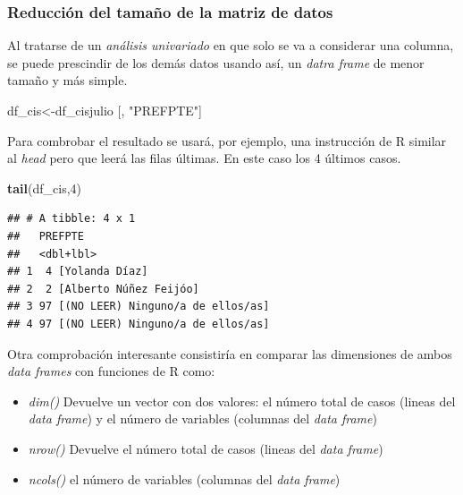 \documentclass[
]{article}
\newenvironment{Shaded}{\begin{snugshade}}{\end{snugshade}}
\newcommand{\DecValTok}[1]{\textcolor[rgb]{0.00,0.00,0.81}{#1}}
\newcommand{\FunctionTok}[1]{\textcolor[rgb]{0.13,0.29,0.53}{\textbf{#1}}}
\newcommand{\NormalTok}[1]{#1}
\newcommand{\OtherTok}[1]{\textcolor[rgb]{0.56,0.35,0.01}{#1}}
\newcommand{\StringTok}[1]{\textcolor[rgb]{0.31,0.60,0.02}{#1}}
\providecommand{\tightlist}{%
  \setlength{\itemsep}{0pt}\setlength{\parskip}{0pt}}
\begin{document}
\hypertarget{reducciuxf3n-del-tamauxf1o-de-la-matriz-de-datos}{%
\subsubsection{Reducción del tamaño de la matriz de
datos}\label{reducciuxf3n-del-tamauxf1o-de-la-matriz-de-datos}}

Al tratarse de un \emph{análisis univariado} en que solo se va a
considerar una columna, se puede prescindir de los demás datos usando
así, un \emph{datra frame} de menor tamaño y más simple.

\begin{Shaded}
\begin{Highlighting}[]
\NormalTok{df\_cis}\OtherTok{\textless{}{-}}\NormalTok{df\_cisjulio [, }\StringTok{"PREFPTE"}\NormalTok{]}
\end{Highlighting}
\end{Shaded}

Para combrobar el resultado se usará, por ejemplo, una instrucción de R
similar al \emph{head} pero que leerá las filas últimas. En este caso
los 4 últimos casos.

\begin{Shaded}
\begin{Highlighting}[]
\FunctionTok{tail}\NormalTok{(df\_cis,}\DecValTok{4}\NormalTok{)}
\end{Highlighting}
\end{Shaded}

\begin{verbatim}
## # A tibble: 4 x 1
##   PREFPTE                             
##   <dbl+lbl>                           
## 1  4 [Yolanda Díaz]                   
## 2  2 [Alberto Núñez Feijóo]           
## 3 97 [(NO LEER) Ninguno/a de ellos/as]
## 4 97 [(NO LEER) Ninguno/a de ellos/as]
\end{verbatim}

Otra comprobación interesante consistiría en comparar las dimensiones de
ambos \emph{data frames} con funciones de R como:

\begin{itemize}
\tightlist
\item
  \emph{dim()} Devuelve un vector con dos valores: el número total de
  casos (lineas del \emph{data frame}) y el número de variables
  (columnas del \emph{data frame})
\item
  \emph{nrow()} Devuelve el número total de casos (lineas del \emph{data
  frame})
\item
  \emph{ncols()} el número de variables (columnas del \emph{data frame})
\end{itemize}
\end{document}

